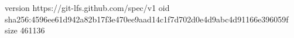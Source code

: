 version https://git-lfs.github.com/spec/v1
oid sha256:4596ee61d942a82b17f3e470ee9aad14c1f7d702d0e4d9abc4d91166e396059f
size 461136
